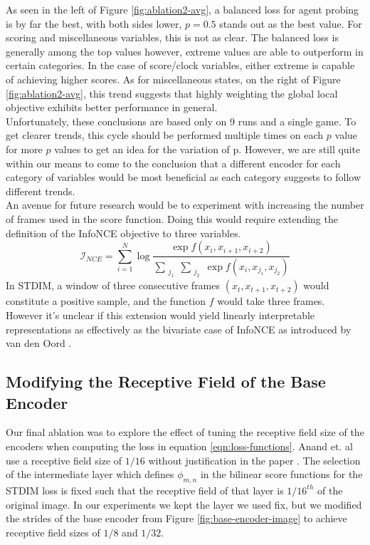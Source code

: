 As seen in the left of Figure \ref{fig:ablation2-avg}, a balanced loss for agent probing is by far the best, with both sides lower, $p=0.5$ stands out as the best value. For scoring and miscellaneous variables, this is not as clear. The balanced loss is generally among the top values however, extreme values are able to outperform in certain categories. In the case of score/clock variables, either extreme is capable of achieving higher scores. As for miscellaneous states, on the right of Figure \ref{fig:ablation2-avg}, this trend suggests that highly weighting the global local objective exhibits better performance in general. \\

Unfortunately, these conclusions are based only on 9 runs and a single game. To get clearer trends, this cycle should be performed multiple times on each $p$ value for more $p$ values to get an idea for the variation of p. However, we are still quite within our means to come to the conclusion that a different encoder for each category of variables would be most beneficial as each category suggests to follow different trends. \\

An avenue for future research would be to experiment with increasing the number of frames used in the score function. Doing this would require extending the definition of the InfoNCE objective to three variables.
\begin{equation}
\mathcal{I}_{NCE}=\sum_{i=1}^N\log{\frac{\exp{f(x_i,x_{i+1},x_{i+2})}}{\sum\limits_{\substack{j_1}}\sum\limits_{\substack{j_2}} \exp{f(x_i,x_{j_{1}},x_{j_{2}})}}}
\end{equation}
In STDIM, a window of three consecutive frames $(x_t, x_{t+1},x_{t+2})$ would constitute a positive sample, and  the function $f$ would take three frames. However it's unclear if this extension would yield linearly interpretable representations as effectively as the bivariate case of InfoNCE as introduced by van den Oord \cite{infoNCE}.

\subsection{Modifying the Receptive Field of the Base Encoder}
\label{section:receptive-field}

Our final ablation was to explore the effect of tuning the receptive field size of the encoders when computing the loss in equation \ref{eqn:loss-functions}. Anand et. al use a receptive field size of $1/16$ without justification in the paper \cite{main_article}. The selection of the intermediate layer which defines $\phi_{m,n}$ in the bilinear score functions for the STDIM loss is fixed such that the receptive field of that layer is $1/16^{th}$ of the original image. In our experiments we kept the layer we used fix, but we modified the strides of the base encoder from Figure \ref{fig:base-encoder-image} to achieve receptive field sizes of $1/8$ and $1/32$.

